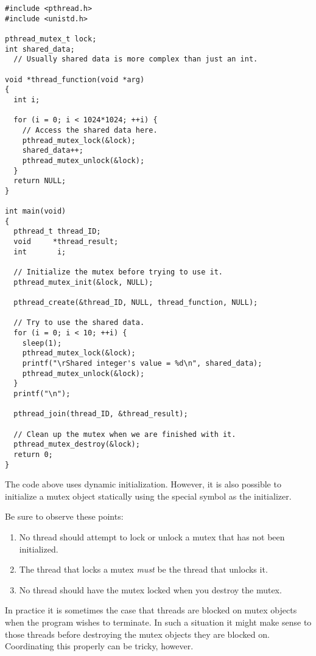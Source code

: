 \begin{lstlisting}[float=tp,frame=single,xleftmargin=0in, caption={Mutex
Example},label=lst:mutex-example]
#include <pthread.h>
#include <unistd.h>

pthread_mutex_t lock;
int shared_data;
  // Usually shared data is more complex than just an int.

void *thread_function(void *arg)
{
  int i;

  for (i = 0; i < 1024*1024; ++i) {
    // Access the shared data here.
    pthread_mutex_lock(&lock);
    shared_data++;
    pthread_mutex_unlock(&lock);
  }
  return NULL;
}

int main(void)
{
  pthread_t thread_ID;
  void     *thread_result;
  int       i;

  // Initialize the mutex before trying to use it.
  pthread_mutex_init(&lock, NULL);

  pthread_create(&thread_ID, NULL, thread_function, NULL);

  // Try to use the shared data.
  for (i = 0; i < 10; ++i) {
    sleep(1);
    pthread_mutex_lock(&lock);
    printf("\rShared integer's value = %d\n", shared_data);
    pthread_mutex_unlock(&lock);
  }
  printf("\n");

  pthread_join(thread_ID, &thread_result);

  // Clean up the mutex when we are finished with it.
  pthread_mutex_destroy(&lock);
  return 0;
}
\end{lstlisting}

The code above uses dynamic initialization. However, it is also possible to initialize a mutex
object statically using the special symbol  as the
initializer.

Be sure to observe these points:

\begin{enumerate}

\item No thread should attempt to lock or unlock a mutex that has not been initialized.

\item The thread that locks a mutex \emph{must} be the thread that unlocks it.

\item No thread should have the mutex locked when you destroy the mutex.

\end{enumerate}

In practice it is sometimes the case that threads are blocked on mutex objects when the program
wishes to terminate. In such a situation it might make sense to 
those threads before destroying the mutex objects they are blocked on. Coordinating this
properly can be tricky, however.

